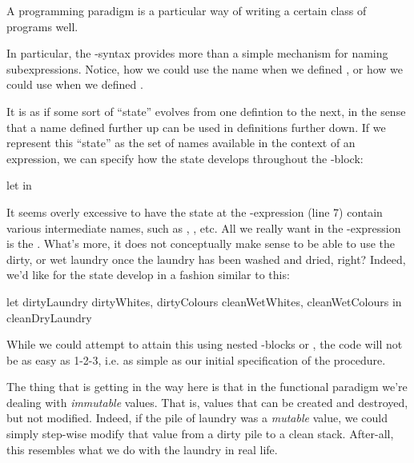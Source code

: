 \begin{definition}

A programming paradigm is a particular way of writing a certain class of
programs well.

\end{definition}

In particular, the -syntax provides more than a simple mechanism for
naming subexpressions. Notice, how we could use the name  when
we defined , or how we could use  when
we defined .

It is as if some sort of ``state'' evolves from one defintion to the next, in
the sense that a name defined further up can be used in definitions further
down. If we represent this ``state'' as the set of names available in the
context of an expression, we can specify how the state develops throughout the
-block: 

\begin{codebox}
\li let
\li in
\end{codebox}

It seems overly excessive to have the state at the -expression (line
7) contain various intermediate names, such as ,
, etc. All we really want in the -expression is
the . What's more, it does not conceptually make sense to be
able to use the dirty, or wet laundry once the laundry has been washed and
dried, right? Indeed, we'd like for the state develop in a fashion similar to
this:

\begin{code}
let
  {dirtyLaundry}
  {dirtyWhites, dirtyColours}
  {cleanWetWhites, cleanWetColours}
in
  {cleanDryLaundry}
\end{code}

While we could attempt to attain this using nested -blocks or
, the code will not be as easy as 1-2-3, i.e.  as
simple as our initial specification of the procedure.

The thing that is getting in the way here is that in the functional paradigm
we're dealing with \emph{immutable} values. That is, values that can be created
and destroyed, but not modified. Indeed, if the pile of laundry was a
\emph{mutable} value, we could simply step-wise modify that value from a dirty
pile to a clean stack. After-all, this resembles what we do with the laundry in
real life.

